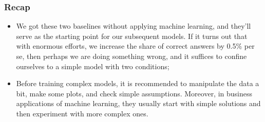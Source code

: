\begin{frame}[fragile]\frametitle{Recap}
\begin{itemize}
\item We got these two baselines without applying machine learning, and they’ll serve as the starting point for our subsequent models. If it turns out that with enormous efforts, we increase the share of correct answers by 0.5\% per se, then perhaps we are doing something wrong, and it suffices to confine ourselves to a simple model with two conditions;
\item Before training complex models, it is recommended to manipulate the data a bit, make some plots, and check simple assumptions. Moreover, in business applications of machine learning, they usually start with simple solutions and then experiment with more complex ones.
\end{itemize}

\end{frame}
